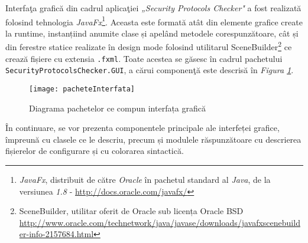 Interfaţa grafică din cadrul aplicaţiei \textit{„Security Protocols Checker"} a fost realizată folosind tehnologia \textit{JavaFx}\footnote{\textit{JavaFx}, distribuit de către \textit{Oracle} în pachetul standard al \textit{Java}, de la versiunea \textit{1.8} - \url{http://docs.oracle.com/javafx/}}. Aceasta este formată atât din elemente grafice create la runtime, instanțiind anumite clase și apelând metodele corespunzătoare, cât și din ferestre statice realizate în design mode folosind utilitarul SceneBuilder\footnote{SceneBuilder, utilitar oferit de Oracle sub licența Oracle BSD \url{http://www.oracle.com/technetwork/java/javase/downloads/javafxscenebuilder-info-2157684.html}} ce crează fișiere cu extensia \texttt{.fxml}. Toate acestea se găsesc în cadrul pachetului \texttt{SecurityProtocolsChecker.GUI}, a cărui componenţă este descrisă în \textit{Figura \ref{fig:diagPacheteGUI}}.
\begin{figure}[h]
	\centering
	\texttt{[image: pacheteInterfata]}
    \caption{Diagrama pachetelor ce compun interfața grafică}
    \label{fig:diagPacheteGUI}
\end{figure}
\par
În continuare, se vor prezenta componentele principale ale interfeței grafice, împreună cu clasele ce le descriu, precum și modulele răspunzătoare cu descrierea fișierelor de configurare și cu colorarea sintactică.
\newpage
